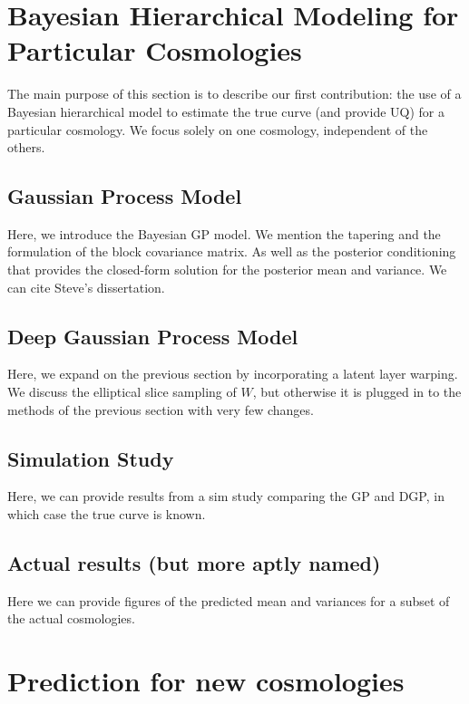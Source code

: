 \documentclass[11pt]{article}
\begin{document}
\section{Bayesian Hierarchical Modeling for Particular Cosmologies}

The main purpose of this section is to describe our first contribution: the use of a Bayesian hierarchical model to estimate the true curve (and provide UQ) for a particular cosmology.  We focus solely on one cosmology, independent of the others.

\subsection{Gaussian Process Model}

Here, we introduce the Bayesian GP model.  We mention the tapering and the formulation of the block covariance matrix.  As well as the posterior conditioning that provides the closed-form solution for the posterior mean and variance.  We can cite Steve's dissertation.

\subsection{Deep Gaussian Process Model}

Here, we expand on the previous section by incorporating a latent layer warping.  We discuss the elliptical slice sampling of $W$, but otherwise it is plugged in to the methods of the previous section with very few changes.

\subsection{Simulation Study}

Here, we can provide results from a sim study comparing the GP and DGP, in which case the true curve is known.

\subsection{Actual results (but more aptly named)}

Here we can provide figures of the predicted mean and variances for a subset of the actual cosmologies.

\section{Prediction for new cosmologies}
\end{document}
